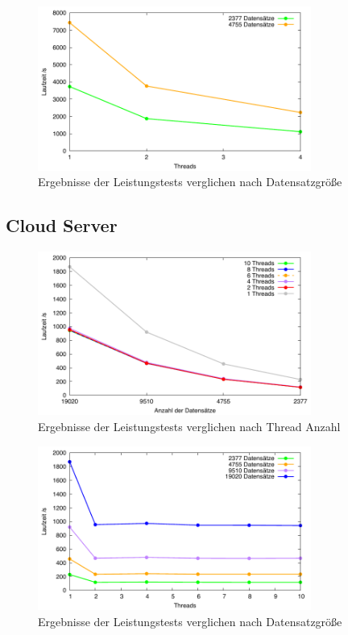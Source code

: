 \begin{figure}[htbp!]
\centering
\includegraphics[width=0.8\textwidth]{../results/plots/raspberrypi3/comp_all_partitions.pdf}
\caption{Ergebnisse der Leistungstests verglichen nach Datensatzgröße}
\label{fig:raspi_benchmark_partitions}
\end{figure}

\subsection{Cloud Server}

\begin{figure}[H]
\centering
\includegraphics[width=0.8\textwidth]{../results/plots/vps/comp_all_threads.pdf}
\caption{Ergebnisse der Leistungstests verglichen nach Thread Anzahl}
\label{fig:vps_benchmark_threads}
\end{figure}

\begin{figure}[htbp!]
\centering
\includegraphics[width=0.8\textwidth]{../results/plots/vps/comp_all_partitions.pdf}
\caption{Ergebnisse der Leistungstests verglichen nach Datensatzgröße}
\label{fig:vps_benchmark_partitions}
\end{figure}

